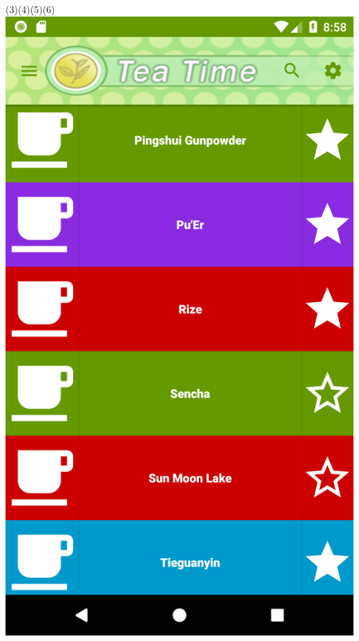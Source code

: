\documentclass[a4paper,12pt]{article}
\begin{document}
\begin{spacing}{1}
 	(3)\space\space\space\space\space\space\space\space\space\space\space\space\space\space\space\space\space\space\space\space\space\space\space\space\space(4)\space\space\space\space\space\space\space\space\space\space\space\space\space\space\space\space\space\space\space\space\space\space\space\space(5)\space\space\space\space\space\space\space\space\space\space\space\space\space\space\space\space\space\space\space\space\space\space\space\space\space(6)\\
	\includegraphics*[scale=0.1]{Screenshot/03.png}    

\end{spacing}
\end{document}
